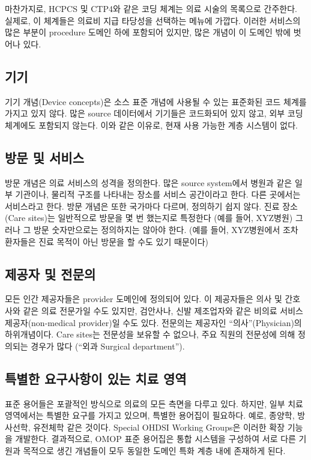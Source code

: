 \documentclass[11pt]{book}
\theoremstyle{definition}
\theoremstyle{definition}
\theoremstyle{definition}
\theoremstyle{remark}
\begin{document}
마찬가지로, HCPCS 및 CTP4와 같은 코딩 체계는 의료 시술의 목록으로
간주한다. 실제로, 이 체계들은 의료비 지급 타당성을 선택하는 메뉴에
가깝다. 이러한 서비스의 많은 부분이 procedure 도메인 하에 포함되어
있지만, 많은 개념이 이 도메인 밖에 벗어나 있다.

\subsection{기기}

기기 개념(Device concepts)은 소스 표준 개념에 사용될 수 있는 표준화된
코드 체계를 가지고 있지 않다. 많은 source 데이터에서 기기들은 코드화되어
있지 않고, 외부 코딩 체계에도 포함되지 않는다. 이와 같은 이유로, 현재
사용 가능한 계층 시스템이 없다.

\subsection{방문 및 서비스}\label{--}

방문 개념은 의료 서비스의 성격을 정의한다. 많은 source system에서 병원과
같은 일부 기관이나, 물리적 구조를 나타내는 장소를 서비스 공간이라고
한다. 다른 곳에서는 서비스라고 한다. 방문 개념은 또한 국가마다 다르며,
정의하기 쉽지 않다. 진료 장소(Care sites)는 일반적으로 방문을 몇 번
했는지로 특정한다 (예를 들어, XYZ병원) 그러나 그 방문 숫자만으로는
정의하지는 않아야 한다. (예를 들어, XYZ병원에서 조차 환자들은 진료
목적이 아닌 방문을 할 수도 있기 때문이다)

\subsection{제공자 및 전문의}\label{--}

모든 인간 제공자들은 provider 도메인에 정의되어 있다. 이 제공자들은 의사
및 간호사와 같은 의료 전문가일 수도 있지만, 검안사나, 신발 제조업자와
같은 비의료 서비스 제공자(non-medical provider)일 수도 있다. 전문의는
제공자인 ``의사''(Physician)의 하위개념이다. Care sites는 전문성을
보유할 수 없으나, 주요 직원의 전문성에 의해 정의되는 경우가 많다 (``외과
Surgical department'').

\subsection{특별한 요구사항이 있는 치료 영역}\label{----}

표준 용어들은 포괄적인 방식으로 의료의 모든 측면을 다루고 있다. 하지만,
일부 치료영역에서는 특별한 요구를 가지고 있으며, 특별한 용어집이
필요하다. 예로, 종양학, 방사선학, 유전체학 같은 것이다. Special OHDSI
Working Groups은 이러한 확장 기능을 개발한다. 결과적으로, OMOP 표준
용어집은 통합 시스템을 구성하여 서로 다른 기원과 목적으로 생긴 개념들이
모두 동일한 도메인 특화 계층 내에 존재하게 된다.
\end{document}
